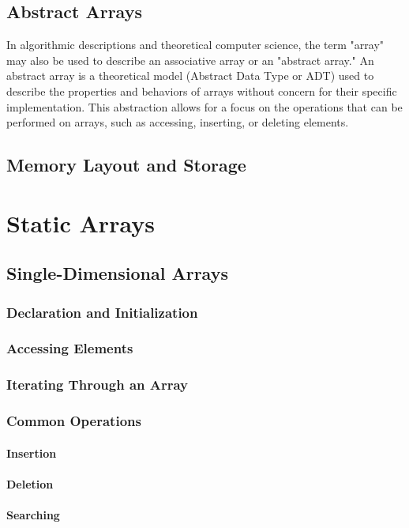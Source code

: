 \documentclass{book}
\begin{document}
\section{Abstract Arrays}
	
In algorithmic descriptions and theoretical computer science, the term "array" may also be used to describe an associative array or an "abstract array." An abstract array is a theoretical model (Abstract Data Type or ADT) used to describe the properties and behaviors of arrays without concern for their specific implementation. This abstraction allows for a focus on the operations that can be performed on arrays, such as accessing, inserting, or deleting elements.
	
	
	\section{Memory Layout and Storage}
	
	\chapter{Static Arrays}
	\section{Single-Dimensional Arrays}
	\subsection{Declaration and Initialization}
	\subsection{Accessing Elements}
	\subsection{Iterating Through an Array}
	\subsection{Common Operations}
	\subsubsection{Insertion}
	\subsubsection{Deletion}
	\subsubsection{Searching}
\end{document}
